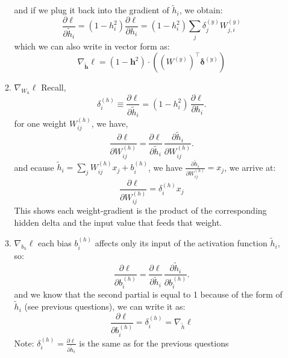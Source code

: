 \documentclass[12pt,a4paper]{article}
\begin{document}
\begin{enumerate}[resume]
\begin{enumerate}
        and if we plug it back into the gradient of $\tilde{h}_i$, we obtain:
        \[
        \frac{\partial \ell}{\partial \tilde{h}_i} 
        = (1 - h_i^2) \frac{\partial \ell}{\partial h_i}
        = (1 - h_i^2) \sum_j \delta_{j}^{(y)} W_{j,i}^{(y)}
        \]
        which we can also write in vector form as:
        \[
        \nabla_{\tilde{\mathbf{h}}}\ell 
        = (1 - \mathbf{h}^2) \cdot \left( (W^{(y)})^\top \boldsymbol{\delta}^{(y)} \right)
        \]
        
        \item $\nabla_{W_h}\ell$ \newline 
        Recall,
        \[
        \delta^{(h)}_i \equiv \frac{\partial \ell}{\partial \tilde{h}_i}
        = (1-h_i^2)\,\frac{\partial \ell}{\partial h_i}.
        \]
        for one weight \(W^{(h)}_{i j}\), we have,
        \[
        \frac{\partial \ell}{\partial W^{(h)}_{i j}}
        = \frac{\partial \ell}{\partial \tilde{h}_i}\,\frac{\partial \tilde{h}_i}{\partial W^{(h)}_{i j}}.
        \]
        and ecause \(\tilde{h}_i = \sum_{j} W^{(h)}_{i j} x_j + b^{(h)}_i\), we have $\frac{\partial \tilde{h}_i}{\partial W^{(h)}_{i j}} = x_j$, we arrive at:
        \[
        \frac{\partial \ell}{\partial W^{(h)}_{i j}} = \delta^{(h)}_i x_j
        \]
        This shows each weight-gradient is the product of the corresponding hidden delta and the input value that feeds that weight.

        
        \item $\nabla_{b_h}\ell$ \newline
        each bias \(b^{(h)}_i\) affects only its input of the activation function \(\tilde{h}_i\), so:
        \[
        \frac{\partial \ell}{\partial b^{(h)}_i}
        = \frac{\partial \ell}{\partial \tilde{h}_i}\,\frac{\partial \tilde{h}_i}{\partial b^{(h)}_i}.
        \]
        and we know that the second partial is equal to 1 because of the form of $\tilde{h}_i$ (see previous questions), we can write it as:
        \[
        \frac{\partial \ell}{\partial b^{(h)}_i} = \delta^{(h)}_i = \nabla_{\tilde{h}}\ell
        \]
        Note: $\delta^{(h)}_i = \frac{\partial \ell}{\partial \tilde{h}_i}$ is the same as for the previous questions
        
    \end{enumerate}

\end{enumerate}
\end{document}
